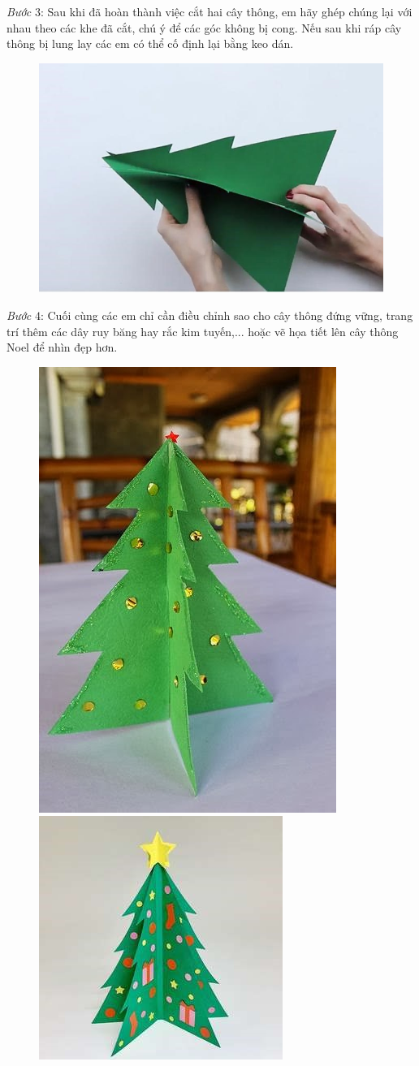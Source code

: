 \begin{multicols}{2}
\begin{figure}[H]
		\vspace*{-15pt}
	\end{figure}
	\textit{Bước} $3$: Sau khi đã hoàn thành việc cắt hai cây thông, em hãy ghép chúng lại với nhau theo các khe đã cắt, chú ý để các góc không bị cong. Nếu sau khi ráp cây thông bị lung lay các em có thể cố định lại bằng keo dán.
	\begin{figure}[H]
		\vspace*{-5pt}
		\centering
		\captionsetup{labelformat= empty, justification=centering}
		\includegraphics[width= 1\linewidth]{8}
		\vspace*{-15pt}
	\end{figure}
	\textit{Bước} $4$: Cuối cùng các em chỉ cần điều chỉnh sao cho cây thông đứng vững, trang trí thêm các dây ruy băng hay rắc kim tuyến,... hoặc vẽ họa tiết lên cây thông Noel để nhìn đẹp hơn.
	\begin{figure}[H]
		\vspace*{-5pt}
		\centering
		\captionsetup{labelformat= empty, justification=centering}
		\includegraphics[height= 0.31\linewidth]{9a}
		\includegraphics[height= 0.31\linewidth]{9b}

\end{figure}
\end{multicols}
